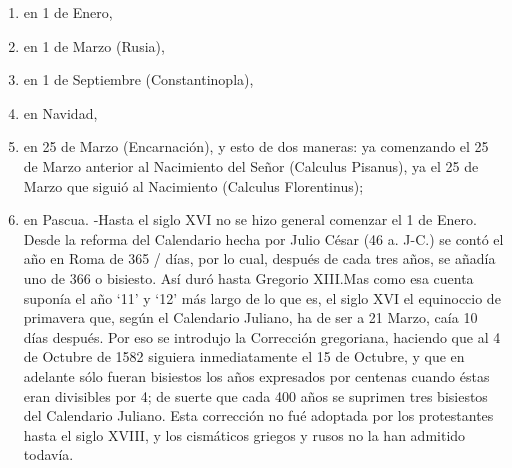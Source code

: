\raggedbottom{} \documentclass[12pt, a4paper]{book}
\begin{document}
\begin{enumerate}
\begin{enumerate}
\begin{enumerate}
                  \item en 1 de Enero,
                  \item en 1 de Marzo (Rusia),
                  \item en 1 de Septiembre (Constantinopla),
                  \item en Navidad,
                  \item en 25 de Marzo (Encarnación), y esto de dos maneras: ya comenzando el 25 de Marzo anterior al Nacimiento del Señor (Calculus Pisanus), ya el 25 de Marzo que siguió al Nacimiento (Calculus Florentinus);
                  \item en Pascua. -Hasta el siglo XVI no se hizo general comenzar el 1 de Enero. Desde la reforma del Calendario hecha por Julio César (46 a. J-C.) se contó el año en Roma de 365 / días, por lo cual, después de cada tres años, se añadía uno de 366 o bisiesto. Así duró hasta Gregorio XIII.\@ Mas como esa cuenta suponía el año `11' y `12' más largo de lo que es, el siglo XVI el equinoccio de primavera que, según el Calendario Juliano, ha de ser a 21 Marzo, caía 10 días después. Por eso se introdujo la Corrección gregoriana, haciendo que al 4 de Octubre de 1582 siguiera inmediatamente el 15 de Octubre, y que en adelante sólo fueran bisiestos los años expresados por centenas cuando éstas eran divisibles por 4; de suerte que cada 400 años se suprimen tres bisiestos del Calendario Juliano. Esta corrección no fué adoptada por los protestantes hasta el siglo XVIII, y los cismáticos griegos y rusos no la han admitido todavía.
                \end{enumerate}
        \end{enumerate}
\end{enumerate}
\end{document}
